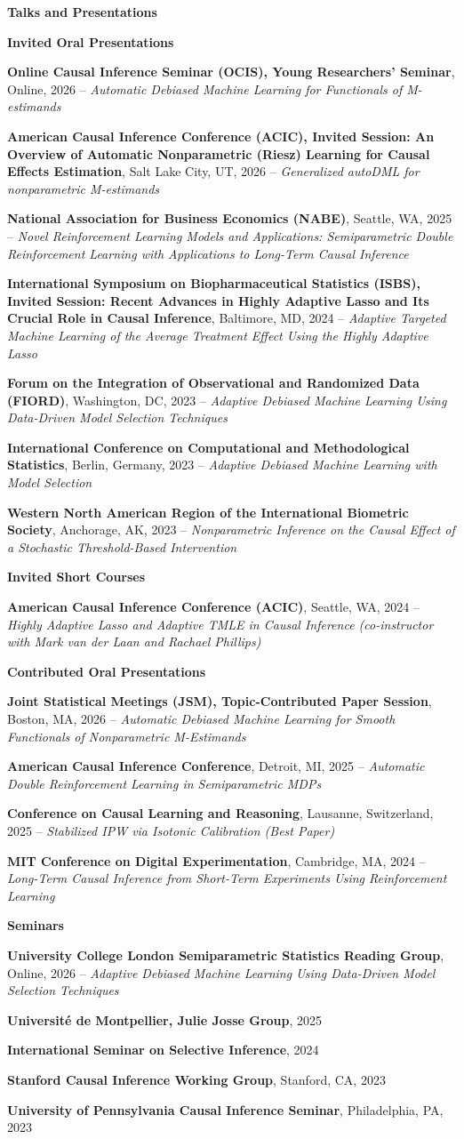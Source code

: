 \documentclass[10pt,letterpaper]{article}
\newcommand{\cvsection}[1]{%
  \vspace{0.55em}%
  {\Large\bfseries #1}\par
  \vspace{0.20em}%
}
\newcommand{\cvsubsection}[1]{%
  \vspace{0.35em}%
  {\large\bfseries #1}\par
  \vspace{0.12em}%
}
\newcommand{\talk}[3]{%
  \textbf{#1}, #2 -- \emph{#3}\par
}
\begin{document}
{\small
\cvsection{Talks and Presentations}
\cvsubsection{Invited Oral Presentations}
\talk{Online Causal Inference Seminar (OCIS), Young Researchers' Seminar}{Online, 2026}{Automatic Debiased Machine Learning for Functionals of M-estimands}
\talk{American Causal Inference Conference (ACIC), Invited Session: An Overview of Automatic Nonparametric (Riesz) Learning for Causal Effects Estimation}{Salt Lake City, UT, 2026}{Generalized autoDML for nonparametric M-estimands}
\talk{National Association for Business Economics (NABE)}{Seattle, WA, 2025}{Novel Reinforcement Learning Models and Applications: Semiparametric Double Reinforcement Learning with Applications to Long-Term Causal Inference}
\talk{International Symposium on Biopharmaceutical Statistics (ISBS), Invited Session: Recent Advances in Highly Adaptive Lasso and Its Crucial Role in Causal Inference}{Baltimore, MD, 2024}{Adaptive Targeted Machine Learning of the Average Treatment Effect Using the Highly Adaptive Lasso}
\talk{Forum on the Integration of Observational and Randomized Data (FIORD)}{Washington, DC, 2023}{Adaptive Debiased Machine Learning Using Data-Driven Model Selection Techniques}
\talk{International Conference on Computational and Methodological Statistics}{Berlin, Germany, 2023}{Adaptive Debiased Machine Learning with Model Selection}
\talk{Western North American Region of the International Biometric Society}{Anchorage, AK, 2023}{Nonparametric Inference on the Causal Effect of a Stochastic Threshold-Based Intervention}

\cvsubsection{Invited Short Courses}
\talk{American Causal Inference Conference (ACIC)}{Seattle, WA, 2024}{Highly Adaptive Lasso and Adaptive TMLE in Causal Inference (co-instructor with Mark van der Laan and Rachael Phillips)}

\cvsubsection{Contributed Oral Presentations}
\talk{Joint Statistical Meetings (JSM), Topic-Contributed Paper Session}{Boston, MA, 2026}{Automatic Debiased Machine Learning for Smooth Functionals of Nonparametric M-Estimands}
\talk{American Causal Inference Conference}{Detroit, MI, 2025}{Automatic Double Reinforcement Learning in Semiparametric MDPs}
\talk{Conference on Causal Learning and Reasoning}{Lausanne, Switzerland, 2025}{Stabilized IPW via Isotonic Calibration (Best Paper)}
\talk{MIT Conference on Digital Experimentation}{Cambridge, MA, 2024}{Long-Term Causal Inference from Short-Term Experiments Using Reinforcement Learning}

\begin{samepage}
\cvsubsection{Seminars}
\talk{University College London Semiparametric Statistics Reading Group}{Online, 2026}{Adaptive Debiased Machine Learning Using Data-Driven Model Selection Techniques}
\textbf{Universit\'e de Montpellier, Julie Josse Group}, 2025\par
\textbf{International Seminar on Selective Inference}, 2024\par
\textbf{Stanford Causal Inference Working Group}, Stanford, CA, 2023\par
\textbf{University of Pennsylvania Causal Inference Seminar}, Philadelphia, PA, 2023
\end{samepage}

}
\end{document}

